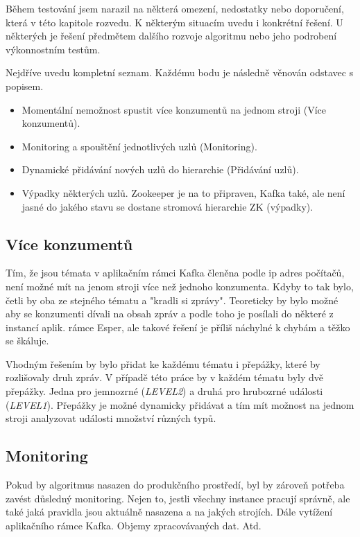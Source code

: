 \documentclass[
  digital, %
  table,   %
  nolof,     %
  nolot,     %
  oneside, %
  nocover,
  monochrome,
  12pt
]{fithesis3}
\begin{document}
Během testování jsem narazil na některá omezení, nedostatky nebo doporučení, která v této kapitole rozvedu. K některým situacím uvedu i konkrétní řešení. U některých je řešení předmětem dalšího rozvoje algoritmu nebo jeho podrobení výkonnostním testům.

Nejdříve uvedu kompletní seznam. Každému bodu je následně věnován odstavec s popisem.

\begin{itemize}
	\item Momentální nemožnost spustit více konzumentů na jednom stroji (Více konzumentů).
	\item Monitoring a spouštění jednotlivých uzlů (Monitoring).
	\item Dynamické přidávání nových uzlů do hierarchie (Přidávání uzlů).
	\item Výpadky některých uzlů. Zookeeper je na to připraven, Kafka také, ale není jasné do jakého stavu se dostane stromová hierarchie ZK (výpadky).
\end{itemize}

\subsection*{Více konzumentů}
Tím, že jsou témata v aplikačním rámci Kafka členěna podle ip adres počítačů, není možné mít na jenom stroji více než jednoho konzumenta. Kdyby to tak bylo, četli by oba ze stejného tématu a "kradli si zprávy". Teoreticky by bylo možné aby se konzumenti dívali na obsah zpráv a podle toho je posílali do některé z instancí aplik. rámce Esper, ale takové řešení je příliš náchylné k chybám a těžko se škáluje.

Vhodným řešením by bylo přidat ke každému tématu i přepážky, které by rozlišovaly druh zpráv. V případě této práce by v každém tématu byly dvě přepážky. Jedna pro jemnozrné (\textit{LEVEL2}) a druhá pro hrubozrné události (\textit{LEVEL1}). Přepážky je možné dynamicky přidávat a tím mít možnost na jednom stroji analyzovat události množství různých typů.

\subsection*{Monitoring}
Pokud by algoritmus nasazen do produkčního prostředí, byl by zároveň potřeba zavést  důsledný monitoring. Nejen to, jestli všechny instance pracují správně, ale také jaká pravidla jsou aktuálně nasazena a na jakých strojích. Dále vytížení aplikačního rámce Kafka. Objemy zpracovávaných dat. Atd.
\end{document}
